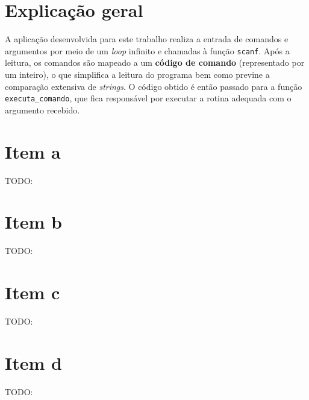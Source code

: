 \documentclass[12pt, twoside, a4paper]{article}
\newcommand{\todo}[1]{{\color{red} TODO: #1}}
\begin{document}
\section{Explicação geral}%

A aplicação desenvolvida para este trabalho realiza a entrada de comandos e argumentos por meio de um \textit{loop} infinito e chamadas à função \verb|scanf|. Após a leitura, os comandos são mapeado a um \textbf{código de comando} (representado por um inteiro), o que simplifica a leitura do programa bem como previne a comparação extensiva de \emph{strings}. O código obtido é então passado para a função \verb|executa_comando|, que fica responsável por executar a rotina adequada com o argumento recebido.

\section{Item a}%
\todo{}

\section{Item b}%
\todo{}

\section{Item c}%
\todo{}

\section{Item d}%
\todo{}
\end{document}
